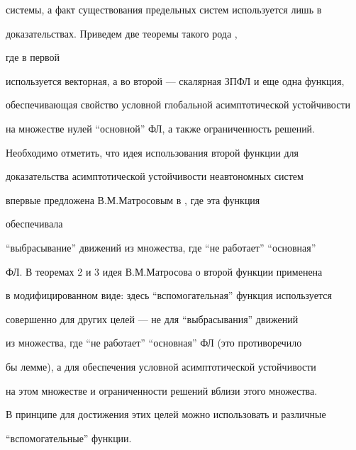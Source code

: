 системы, а факт существования предельных систем используется лишь в 


доказательствах. Приведем две теоремы такого рода \cite{Kos3}, 


где в первой 


используется векторная, а во второй --- скалярная ЗПФЛ и еще одна функция, 


обеспечивающая свойство условной глобальной асимптотической устойчивости 


на множестве нулей ``основной'' ФЛ, а также ограниченность решений. 


 


Необходимо отметить, что идея использования второй функции для 


доказательства асимптотической устойчивости неавтономных систем 


впервые предложена В.М.Матросовым в \cite{M3}, где эта функция 


обеспечивала 


``выбрасывание'' движений из множества, где ``не работает'' ``основная'' 


ФЛ. В теоремах 2 и 3 идея В.М.Матросова о второй функции применена 


в модифицированном виде: здесь ``вспомогательная'' функция используется 


совершенно для других целей --- не для ``выбрасывания'' движений 


из множества, где ``не работает'' ``основная'' ФЛ (это противоречило 


бы лемме), а для обеспечения условной асимптотической устойчивости 


на этом множестве и ограниченности решений вблизи этого множества. 


В принципе для достижения этих целей можно использовать и различные 


``вспомогательные'' функции. 


 





